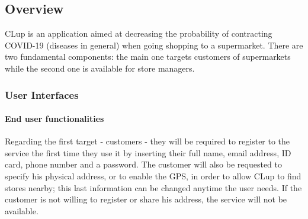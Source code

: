 \subsection{Overview}

CLup is an application aimed at decreasing the probability of contracting COVID-19 (diseases in general) when going shopping to a supermarket. There are two fundamental components: the main one targets customers of supermarkets while the second one is available for store managers.\newline
\subsubsection{User Interfaces}
\paragraph{End user functionalities}
Regarding the first target - customers - they will be required to register to the service the first time they use it by inserting their full name, email address, ID card, phone number and a password. The customer will also be requested to specify his physical address, or to enable the GPS, in order to allow CLup to find stores nearby; this last information can be changed anytime the user needs. If the customer is not willing to register or share his address, the service will not be available.
